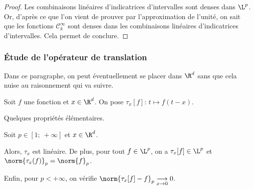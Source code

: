 \begin{proof}
Les combinaisons linéaires d'indicatrices d'intervalles sont denses dans $\L^p$. Or, d'après ce que l'on vient de prouver par l'approximation de l'unité, on sait que les fonctions $\mathcal{C}^{\infty}_k$ sont denses dans les combinaisons linéaires d'indicatrices d'intervalles. Cela permet de conclure.
\end{proof}

\subsubsection{Étude de l'opérateur de translation}

Dans ce paragraphe, on peut éventuellement se placer dans $\R^d$ sans que cela nuise au raisonnement qui va suivre.

\begin{de}
Soit $f$ une fonction et $x \in \R^d$. On pose $\tau_x[f]: \, t \mapsto f(t-x)$.
\end{de}

Quelques propriétés élémentaires.

\begin{prop}
Soit $p \in [1;~+\infty]$ et $x \in \R^d$.

\medskip
Alors, $\tau_x$ est linéaire. De plus, pour tout $f \in \L^p$, on a $\tau_x[f] \in \L^p$ et $\norm{\tau_x(f)}_p = \norm{f}_p$.

\medskip
Enfin, pour $p< +\infty$, on vérifie $\norm{\tau_x[f] - f}_p \underset{x \to 0}{\longrightarrow} 0$.
\end{prop}

